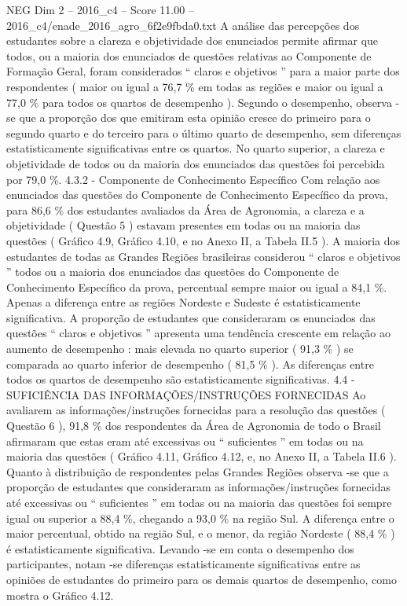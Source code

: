 \begin{textsample}{NEG Dim 2 – 2016\_c4 – Score 11.00 – 2016\_c4/enade\_2016\_agro\_6f2e9fbda0.txt}
A análise das percepções dos estudantes sobre a clareza e objetividade dos enunciados permite afirmar que todos, ou a maioria dos enunciados de questões relativas ao Componente de Formação Geral, foram considerados “ claros e objetivos ” para a maior parte dos respondentes ( maior ou igual a 76,7 \% em todas as regiões e maior ou igual a 77,0 \% para todos os quartos de desempenho ).
Segundo o desempenho, observa -se que a proporção dos que emitiram esta opinião cresce do primeiro para o segundo quarto e do terceiro para o último quarto de desempenho, sem diferenças estatisticamente significativas entre os quartos.
No quarto superior, a clareza e objetividade de todos ou da maioria dos enunciados das questões foi percebida por 79,0 \%. 4.3.2 - Componente de Conhecimento Específico Com relação aos enunciados das questões do Componente de Conhecimento Específico da prova, para 86,6 \% dos estudantes avaliados da Área de Agronomia, a clareza e a objetividade ( Questão 5 ) estavam presentes em todas ou na maioria das questões ( Gráfico 4.9, Gráfico 4.10, e no Anexo II, a Tabela II.5 ).
A maioria dos estudantes de todas as Grandes Regiões brasileiras considerou “ claros e objetivos ” todos ou a maioria dos enunciados das questões do Componente de Conhecimento Específico da prova, percentual sempre maior ou igual a 84,1 \%.
Apenas a diferença entre as regiões Nordeste e Sudeste é estatisticamente significativa.
A proporção de estudantes que consideraram os enunciados das questões “ claros e objetivos ” apresenta uma tendência crescente em relação ao aumento de desempenho : mais elevada no quarto superior ( 91,3 \% ) se comparada ao quarto inferior de desempenho ( 81,5 \% ).
As diferenças entre todos os quartos de desempenho são estatisticamente significativas. 4.4 - SUFICIÊNCIA DAS INFORMAÇÕES/INSTRUÇÕES FORNECIDAS Ao avaliarem as informações/instruções fornecidas para a resolução das questões ( Questão 6 ), 91,8 \% dos respondentes da Área de Agronomia de todo o Brasil afirmaram que estas eram até excessivas ou “ suficientes ” em todas ou na maioria das questões ( Gráfico 4.11, Gráfico 4.12, e, no Anexo II, a Tabela II.6 ).
Quanto à distribuição de respondentes pelas Grandes Regiões observa -se que a proporção de estudantes que consideraram as informações/instruções fornecidas até excessivas ou “ suficientes ” em todas ou na maioria das questões foi sempre igual ou superior a 88,4 \%, chegando a 93,0 \% na região Sul.
A diferença entre o maior percentual, obtido na região Sul, e o menor, da região Nordeste ( 88,4 \% ) é estatisticamente significativa.
Levando -se em conta o desempenho dos participantes, notam -se diferenças estatisticamente significativas entre as opiniões de estudantes do primeiro para os demais quartos de desempenho, como mostra o Gráfico 4.12.

\end{textsample}
